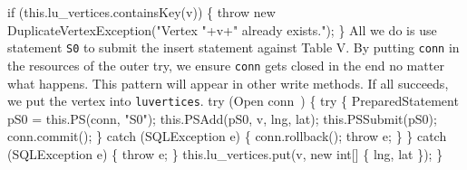 \nwenddocs{}\plusendmoddef
  if (this.lu_vertices.containsKey(v)) \{
    throw new DuplicateVertexException("Vertex "+v+" already exists.");
  \}
\nwendcode{}\nwdocspar
{\small All we do is use statement {\tt{}\protect{}S0} to submit the insert statement
against Table V. By putting {\tt{}conn} in the resources of the outer try, we
ensure {\tt{}conn} gets closed in the end no matter what happens. This pattern
will appear in other write methods. If all succeeds, we put the vertex into
{\tt{}lu{}vertices}.}
\nwenddocs{}\plusendmoddef
  try (\LA{}Open \code{}conn\edoc{}~{\nwtagstyle{}}\RA{}) \{
    try \{
      PreparedStatement pS0 = this.PS(conn, "S0");
      this.PSAdd(pS0, v, lng, lat);
      this.PSSubmit(pS0);
      conn.commit();
    \} catch (SQLException e) \{
      conn.rollback();
      throw e;
    \}
  \} catch (SQLException e) \{
    throw e;
  \}
  this.lu_vertices.put(v, new int[] \{ lng, lat \});
\}
\nwendcode{}\nwdocspar

